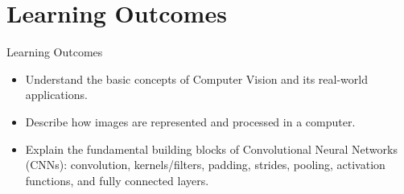 \section{Learning Outcomes}
\begin{frame}{Learning Outcomes}
\begin{itemize}
    \item Understand the basic concepts of Computer Vision and its real-world applications.
    \item Describe how images are represented and processed in a computer.
    \item Explain the fundamental building blocks of Convolutional Neural Networks (CNNs): convolution, kernels/filters, padding, strides, pooling, activation functions, and fully connected layers.
\end{itemize}
\end{frame}
